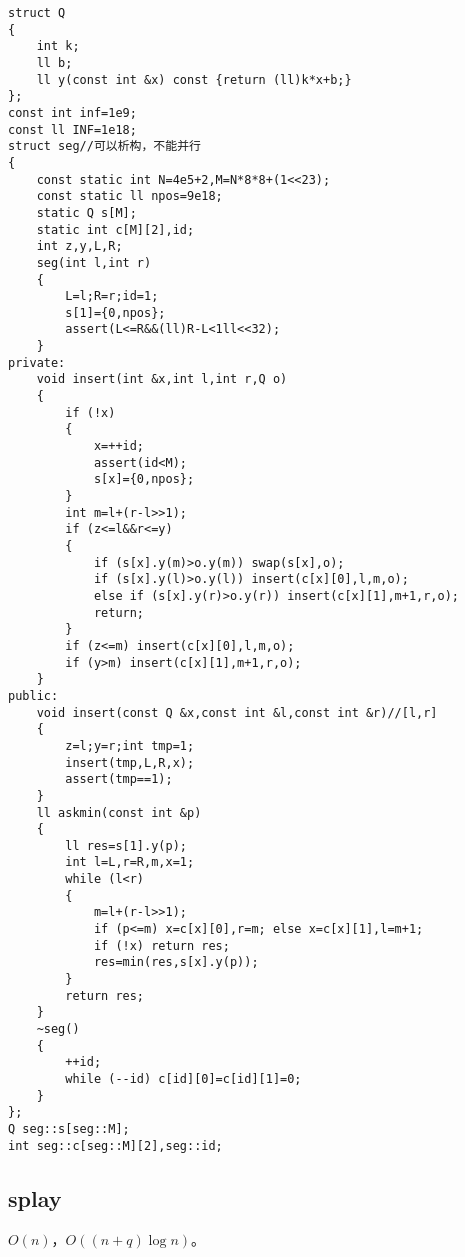 \documentclass{ctexart}
\begin{document}
\begin{lstlisting}
struct Q
{
	int k;
	ll b;
	ll y(const int &x) const {return (ll)k*x+b;}
};
const int inf=1e9;
const ll INF=1e18;
struct seg//可以析构，不能并行
{
	const static int N=4e5+2,M=N*8*8+(1<<23);
	const static ll npos=9e18;
	static Q s[M];
	static int c[M][2],id;
	int z,y,L,R;
	seg(int l,int r)
	{
		L=l;R=r;id=1;
		s[1]={0,npos};
		assert(L<=R&&(ll)R-L<1ll<<32);
	}
private:
	void insert(int &x,int l,int r,Q o)
	{
		if (!x)
		{
			x=++id;
			assert(id<M);
			s[x]={0,npos};
		}
		int m=l+(r-l>>1);
		if (z<=l&&r<=y)
		{
			if (s[x].y(m)>o.y(m)) swap(s[x],o);
			if (s[x].y(l)>o.y(l)) insert(c[x][0],l,m,o);
			else if (s[x].y(r)>o.y(r)) insert(c[x][1],m+1,r,o);
			return;
		}
		if (z<=m) insert(c[x][0],l,m,o);
		if (y>m) insert(c[x][1],m+1,r,o);
	}
public:
	void insert(const Q &x,const int &l,const int &r)//[l,r]
	{
		z=l;y=r;int tmp=1;
		insert(tmp,L,R,x);
		assert(tmp==1);
	}
	ll askmin(const int &p)
	{
		ll res=s[1].y(p);
		int l=L,r=R,m,x=1;
		while (l<r)
		{
			m=l+(r-l>>1);
			if (p<=m) x=c[x][0],r=m; else x=c[x][1],l=m+1;
			if (!x) return res;
			res=min(res,s[x].y(p));
		}
		return res;
	}
	~seg()
	{
		++id;
		while (--id) c[id][0]=c[id][1]=0;
	}
};
Q seg::s[seg::M];
int seg::c[seg::M][2],seg::id;
\end{lstlisting}

\subsection{splay}

$O(n)$，$O((n+q)\log n)$。
\end{document}
